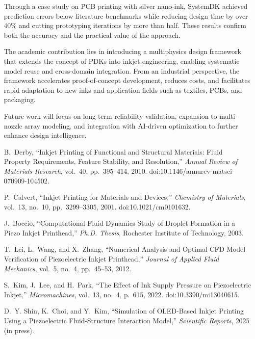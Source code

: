 \documentclass[conference]{IEEEtran}
\begin{document}
Through a case study on PCB printing with silver nano-ink, SystemDK achieved prediction errors below literature benchmarks while reducing design time by over 40\% and cutting prototyping iterations by more than half. These results confirm both the accuracy and the practical value of the approach.  

The academic contribution lies in introducing a multiphysics design framework that extends the concept of PDKs into inkjet engineering, enabling systematic model reuse and cross-domain integration.  
From an industrial perspective, the framework accelerates proof-of-concept development, reduces costs, and facilitates rapid adaptation to new inks and application fields such as textiles, PCBs, and packaging.  

Future work will focus on long-term reliability validation, expansion to multi-nozzle array modeling, and integration with AI-driven optimization to further enhance design intelligence.

\begin{thebibliography}{99}

B.~Derby, ``Inkjet Printing of Functional and Structural Materials: Fluid Property Requirements, Feature Stability, and Resolution,'' 
\emph{Annual Review of Materials Research}, vol.~40, pp.~395--414, 2010. doi:10.1146/annurev-matsci-070909-104502.

P.~Calvert, ``Inkjet Printing for Materials and Devices,'' 
\emph{Chemistry of Materials}, vol.~13, no.~10, pp.~3299--3305, 2001. doi:10.1021/cm0101632.

J.~Boccio, ``Computational Fluid Dynamics Study of Droplet Formation in a Piezo Inkjet Printhead,'' 
\emph{Ph.D. Thesis}, Rochester Institute of Technology, 2003.

T.~Lei, L.~Wang, and X.~Zhang, ``Numerical Analysis and Optimal CFD Model Verification of Piezoelectric Inkjet Printhead,'' 
\emph{Journal of Applied Fluid Mechanics}, vol.~5, no.~4, pp.~45--53, 2012.

S.~Kim, J.~Lee, and H.~Park, ``The Effect of Ink Supply Pressure on Piezoelectric Inkjet,'' 
\emph{Micromachines}, vol.~13, no.~4, p.~615, 2022. doi:10.3390/mi13040615.

D.~Y. Shin, K.~Choi, and Y.~Kim, ``Simulation of OLED-Based Inkjet Printing Using a Piezoelectric Fluid-Structure Interaction Model,'' 
\emph{Scientific Reports}, 2025 (in press).

\end{thebibliography}
\end{document}
